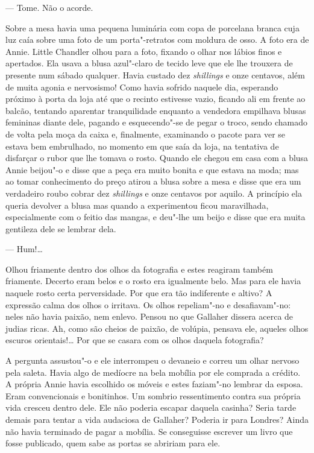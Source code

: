 --- Tome.  Não o acorde.

Sobre a mesa havia uma pequena luminária com copa de porcelana branca cuja luz
caía sobre uma foto de um porta"-retratos com moldura de osso.  A foto era de
Annie.  Little Chandler olhou para a foto, fixando o olhar nos lábios finos e
apertados.  Ela usava a blusa azul"-claro de tecido leve que ele lhe trouxera de
presente num sábado qualquer.  Havia custado dez \textit{shillings} e onze
centavos, além de muita agonia e nervosismo! Como havia sofrido naquele dia,
esperando próximo à porta da loja até que o recinto estivesse vazio, ficando
ali em frente ao balcão, tentando aparentar tranquilidade enquanto a vendedora
empilhava blusas femininas diante dele, pagando e esquecendo"-se de pegar o
troco, sendo chamado de volta pela moça da caixa e, finalmente, examinando o
pacote para ver se estava bem embrulhado, no momento em que saía da loja, na
tentativa de disfarçar o rubor que lhe tomava o rosto.  Quando ele chegou em
casa com a blusa Annie beijou"-o e disse que a peça era muito bonita e que
estava na moda; mas ao tomar conhecimento do preço atirou a blusa sobre a mesa
e disse que era um verdadeiro roubo cobrar dez \textit{shillings} e onze
centavos por aquilo.  A princípio ela queria devolver a blusa mas quando a
experimentou ficou maravilhada, especialmente com o feitio das mangas, e
deu"-lhe um beijo e disse que era muita gentileza dele se lembrar dela.

--- Hum!\ldots{}

Olhou friamente dentro dos olhos da fotografia e estes reagiram também
friamente.  Decerto eram belos e o rosto era igualmente belo.  Mas para ele
havia naquele rosto certa perversidade.  Por que era tão indiferente e altivo?
A expressão calma dos olhos o irritava.  Os olhos repeliam"-no e desafiavam"-no:
neles não havia paixão, nem enlevo.  Pensou no que Gallaher dissera acerca de
judias ricas.  Ah, como são cheios de paixão, de volúpia, pensava ele, aqueles
olhos escuros orientais!\ldots{} Por que se casara com os olhos daquela
fotografia?

A pergunta assustou"-o e ele interrompeu o devaneio e correu um olhar nervoso
pela saleta.  Havia algo de medíocre na bela mobília por ele comprada a
crédito.  A própria Annie havia escolhido os móveis e estes faziam"-no lembrar
da esposa.  Eram convencionais e bonitinhos.  Um sombrio ressentimento contra
sua própria vida cresceu dentro dele.  Ele não poderia escapar daquela casinha?
Seria tarde demais para tentar a vida audaciosa de Gallaher?  Poderia ir para
Londres?  Ainda não havia terminado de pagar a mobília.  Se conseguisse
escrever um livro que fosse publicado, quem sabe as portas se abririam para
ele.

